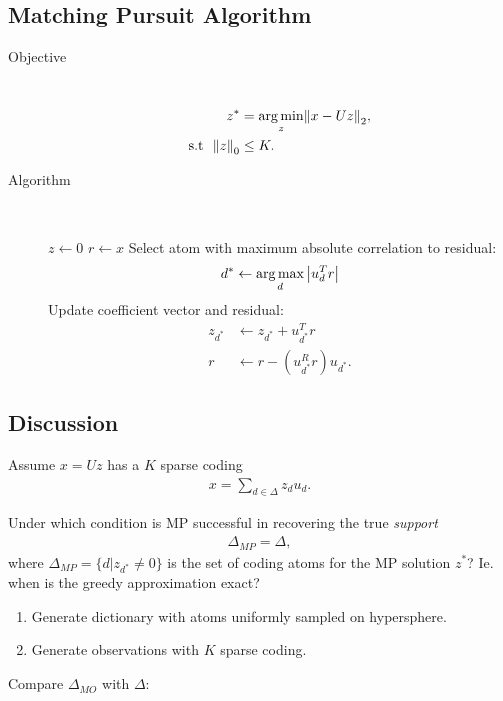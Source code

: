 \subsection{Matching Pursuit Algorithm}
\begin{description}
\item[Objective] $\ $
    \begin{align*}
        z^* &= \argmin_z \norm{x-Uz}_2,\\
        \text{s.t }\ \norm{z}_0 &\leq K.
    \end{align*}

\item[Algorithm] $\ $
    \begin{algorithmic}
        \STATE $z\gets 0$
        \STATE $r\gets x$
            \STATE Select atom with maximum absolute correlation to residual:
                \begin{align*}
                 d^* \gets \operatorname*{arg\,max}_d \left|  u_d^T r \right|
                \end{align*}
            \STATE Update coefficient vector and residual:
                \begin{align*}
                     z_{d^*} &\gets z_{d^*} + u_{d^*}^Tr\\
                     r &\gets r-\left( u_{d^*}^R r\right) u_{d^*}.
                \end{align*}
        \ENDWHILE
    \end{algorithmic}
\end{description}


\subsection{Discussion}
Assume $x=Uz$ has a $K$ sparse coding
\begin{align*}
 x=\sum_{d\in \Delta} z_d u_d.
\end{align*}

Under which condition is MP successful in recovering the true \emph{support}
\begin{align*}
    \Delta_{MP} = \Delta,
\end{align*}
where $\Delta_{MP} = \{d|z_{d^*} \neq 0\}$ is the set of coding atoms for the MP solution $z^*$?
Ie. when is the greedy approximation exact?

\begin{enumerate}
    \item Generate dictionary with atoms uniformly sampled on hypersphere.
    \item Generate observations with $K$ sparse coding.
\end{enumerate}
Compare $\Delta_{MO}$ with $\Delta$:

